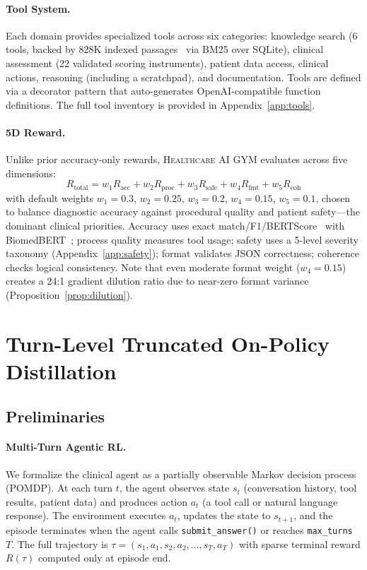 \documentclass{article}
\newcommand{\gym}{\textsc{Healthcare AI GYM}}
\begin{document}
\paragraph{Tool System.} Each domain provides specialized tools across six categories: knowledge search (6 tools, backed by 828K indexed passages~\citep{xiong2024medcpt} via BM25 over SQLite), clinical assessment (22 validated scoring instruments), patient data access, clinical actions, reasoning (including a scratchpad), and documentation. Tools are defined via a decorator pattern that auto-generates OpenAI-compatible function definitions. The full tool inventory is provided in Appendix~\ref{app:tools}.

\paragraph{5D Reward.} Unlike prior accuracy-only rewards, \gym{} evaluates across five dimensions:
\begin{equation}
    R_{\text{total}} = w_1 R_{\text{acc}} + w_2 R_{\text{proc}} + w_3 R_{\text{safe}} + w_4 R_{\text{fmt}} + w_5 R_{\text{coh}}
\label{eq:reward}
\end{equation}
with default weights $w_1{=}0.3$, $w_2{=}0.25$, $w_3{=}0.2$, $w_4{=}0.15$, $w_5{=}0.1$, chosen to balance diagnostic accuracy against procedural quality and patient safety---the dominant clinical priorities. Accuracy uses exact match/F1/BERTScore~\citep{zhang2020bertscore} with BiomedBERT~\citep{gu2021pubmedbert}; process quality measures tool usage; safety uses a 5-level severity taxonomy (Appendix~\ref{app:safety}); format validates JSON correctness; coherence checks logical consistency. Note that even moderate format weight ($w_4{=}0.15$) creates a 24:1 gradient dilution ratio due to near-zero format variance (Proposition~\ref{prop:dilution}).


\section{Turn-Level Truncated On-Policy Distillation}
\label{sec:training}

\subsection{Preliminaries}
\label{sec:preliminaries}

\paragraph{Multi-Turn Agentic RL.}
We formalize the clinical agent as a partially observable Markov decision process (POMDP). At each turn $t$, the agent observes state $s_t$ (conversation history, tool results, patient data) and produces action $a_t$ (a tool call or natural language response). The environment executes $a_t$, updates the state to $s_{t+1}$, and the episode terminates when the agent calls \texttt{submit\_answer()} or reaches \texttt{max\_turns}~$T$. The full trajectory is $\tau = (s_1, a_1, s_2, a_2, \ldots, s_T, a_T)$ with sparse terminal reward $R(\tau)$ computed only at episode end.
\end{document}
